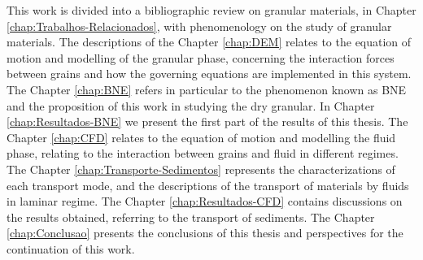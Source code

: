     This work is divided into a bibliographic review on granular materials, in Chapter \ref{chap:Trabalhos-Relacionados}, with phenomenology on the study of granular materials. The descriptions of the Chapter \ref{chap:DEM} relates to the equation of motion and modelling of the granular phase, concerning the interaction forces between grains and how the governing equations are implemented in this system. The Chapter \ref{chap:BNE} refers in particular to the phenomenon known as BNE and the proposition of this work in studying the dry granular. In Chapter \ref{chap:Resultados-BNE} we present the first part of the results of this thesis. The Chapter \ref{chap:CFD} relates to the equation of motion and modelling the fluid phase, relating to the interaction between grains and fluid in different regimes. The Chapter \ref{chap:Transporte-Sedimentos} represents the characterizations of each transport mode, and the descriptions of the transport of materials by fluids in laminar regime. The Chapter \ref{chap:Resultados-CFD} contains discussions on the results obtained, referring to the transport of sediments. The Chapter \ref{chap:Conclusao} presents the conclusions of this thesis and perspectives for the continuation of this work.
